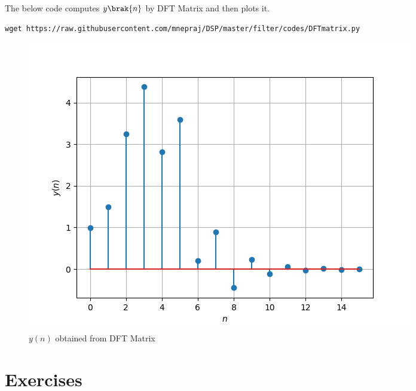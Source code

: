 \documentclass[journal,12pt,twocolumn]{IEEEtran}
\renewcommand\thesection{\arabic{section}}
\begin{document}
\begin{enumerate}[label=\thesection.\arabic*]
	      The below code computes $y\brak{n}$ by DFT Matrix and then plots it.
	      \begin{lstlisting}
wget https://raw.githubusercontent.com/mnepraj/DSP/master/filter/codes/DFTmatrix.py
\end{lstlisting}
	      \begin{figure}[h]
		      \centering
		      \includegraphics[width=\columnwidth]{figs/ynDFTmatrix.png}
		      \caption{$y(n)$ obtained from DFT Matrix}
		      \label{fig:yn_DFT_matrix}
	      \end{figure}
\end{enumerate}
%
\section{Exercises}
\end{document}

